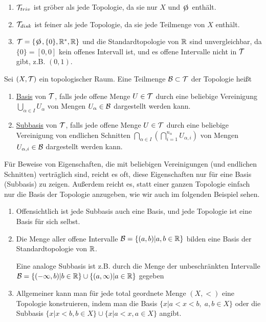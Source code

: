 \begin{example}
    \begin{enumerate}
        \item $\mathcal{T}_{triv}$ ist gröber als jede Topologie, da sie nur $X$ und $\e$ enthält.
        \item $\mathcal{T}_{disk}$ ist feiner als jede Topologie, da sie jede Teilmenge von $X$ enthält.
        \item $\T = \{\e, \{0\}, \R^*, \R\}$ und die Standardtopologie von $\mathbb{R}$ sind unvergleichbar, da $\{0\} = [0, 0]$ kein offenes Intervall ist, und es offene Intervalle nicht in $\mathcal{T}$ gibt, z.B. $(0, 1)$.
    \end{enumerate}
\end{example}

\begin{definition}
    Sei $(X, \mathcal{T})$ ein topologischer Raum. Eine Teilmenge $\mathcal{B} \subset \mathcal{T}$ der Topologie heißt
    \begin{enumerate}
        \item \underline{Basis} von $\mathcal{T}$, falls jede offene Menge $U \in \mathcal{T}$ durch eine beliebige Vereinigung $\bigcup\limits_{\alpha \in I} U_{\alpha}$ von Mengen $U_{\alpha} \in \mathcal{B}$ dargestellt werden kann.
        \item \underline{Subbasis} von $\mathcal{T}$, falls jede offene Menge $U \in \mathcal{T}$ durch eine beliebige Vereinigung von endlichen Schnitten $\bigcap\limits_{\alpha \in I} \left( \bigcap\limits_{i=1}^{n_{\alpha}} U_{\alpha,i} \right)$ von Mengen $U_{\alpha,i} \in \mathcal{B}$ dargestellt werden kann.
    \end{enumerate}
\end{definition}

Für Beweise von Eigenschaften, die mit beliebigen Vereinigungen (und endlichen Schnitten) verträglich sind, reicht es oft, diese Eigenschaften nur für eine Basis (Subbasis) zu zeigen. Außerdem reicht es, statt einer ganzen Topologie einfach nur die Basis der Topologie anzugeben, wie wir auch im folgenden Beispiel sehen.

\begin{example}
    \begin{enumerate}[label=(\arabic*)]
        \item Offensichtlich ist jede Subbasis auch eine Basis, und jede Topologie ist eine Basis für sich selbst.
        \item Die Menge aller offene Intervalle $\mathcal{B} = \{(a, b) | a, b \in \mathbb{R}\}$ bilden eine Basis der Standardtopologie von $\mathbb{R}$.

        Eine analoge Subbasis ist z.B. durch die Menge der unbeschränkten Intervalle $\mathcal{B} = \{ (-\infty, b) | b \in \mathbb{R} \} \cup \{ (a, \infty) | a \in \mathbb{R} \}$ gegeben
        \item Allgemeiner kann man für jede total geordnete Menge $(X, <)$ eine Topologie konstruieren, indem man die Basis $\{ x | a < x < b, \; a, b \in X\}$ oder die Subbasis $\{x | x < b, b \in X\} \cup \{ x | a < x, a \in X\}$ angibt.
    \end{enumerate}
\end{example}

